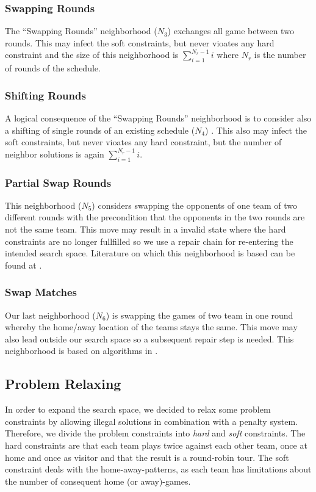 \documentclass[a4paper,11pt]{article}
\begin{document}
\subsubsection{Swapping Rounds}
The ``Swapping Rounds'' neighborhood ($N_3$)  exchanges all game between two rounds. This may infect the soft constraints, but never vioates any hard constraint and the 
size of this neighborhood is $\sum_{i=1}^{N_r-1}i$ where $N_r$ is the number of rounds of the schedule.

\subsubsection{Shifting Rounds}
A logical consequence of the ``Swapping Rounds'' neighborhood is to consider also a shifting of single rounds of an existing schedule ($N_4$) . 
This also may infect the soft constraints, but never vioates any hard constraint, but the number of neighbor solutions is again $\sum_{i=1}^{N_r-1}i$.

\subsubsection{Partial Swap Rounds}
This neighborhood ($N_5$) considers swapping the opponents of one team of two different rounds with the precondition that the opponents in the 
two rounds are not the same team. This move may result in a invalid state where the hard constraints are no longer fullfilled so we use a 
repair chain for re-entering the intended search space. Literature on which this neighborhood is based can be found at \cite{Gaspero07,HentenryckV06, Chen_anant}.

\subsubsection{Swap Matches}
Our last neighborhood ($N_6$) is swapping the games of two team  in one round whereby the home/away location of the teams stays the same.
This move may also lead outside our search space so a subsequent repair step is needed. This neighborhood is based on algorithms in \cite{Gaspero07, HentenryckV06}.

\subsection{Problem Relaxing}
In order to expand the search space, we decided to relax some problem constraints by allowing illegal solutions in combination with a penalty system.
Therefore, we divide the problem constraints into \emph{hard} and \emph{soft} constraints. The hard constraints are that each team plays twice against 
each other team, once at home and once as visitor and that the result is a round-robin tour. 
The soft constraint deals with the home-away-patterns, as each team has limitations about the number of consequent home (or away)-games.
\end{document}
